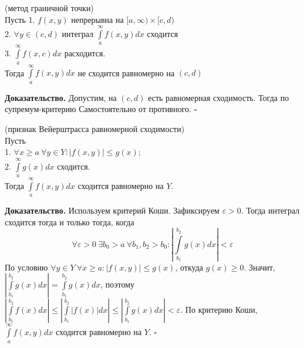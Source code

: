 \begin{theor}
    (метод граничной точки)\\
    Пусть 1. $f(x,y)$ непрерывна на $[a,\infty)\times[c,d)$\\
    2. $\forall y\in (c,d)$ интеграл $\int\limits_{a}^{\infty} f(x,y)dx$ 
    сходится \\
    3. $\int\limits_{a}^{\infty}f(x,c)dx$ расходится.\\
    Тогда $\int\limits_{a}^{\infty}f(x,y)dx$ не сходится равномерно на 
    $(c,d)$
\end{theor}
\textbf{Доказательство.} Допустим, на $(c,d)$ есть равномерная сходимость.
Тогда по супремум-критерию
Самостоятельно от противного. 
$\square$ 

\begin{theor}
    (признак Вейерштрасса равномерной сходимости)\\
    Пусть\\
    1. $\forall x\geqslant a~\forall y\in Y:|f(x,y)|\leqslant g(x)$;\\
    2. $\int\limits_{a}^{\infty}g(x)dx$ сходится.\\
Тогда $\int\limits_{a}^{\infty}f(x,y)dx$ сходится равномерно на  $Y$.
\end{theor}
\textbf{Доказательство.}  Используем критерий Коши. Зафиксируем 
$\varepsilon>0$. Тогда интеграл сходится тогда и только тогда, когда
$$\forall \varepsilon>0~\exists b_0>a~\forall b_1,b_2>b_0:
\left| \int\limits_{b_1}^{b_2} g(x)dx \right|<\varepsilon$$
По условию $\forall y\in Y~\forall x\geqslant a:|f(x,y)|\leqslant g(x)$, 
откуда $g(x)\geqslant 0$. Значит,
$\left|\int\limits_{b_1}^{b_2}g(x)dx\right|=\int\limits_{b_1}^{b_2}g(x)dx$,
поэтому $\left| \int\limits_{b_1}^{b_2}f(x)dx \right| \leqslant 
\left| \int\limits_{b_1}^{b_2} |f(x)|dx \right| \leqslant 
\left| \int\limits_{b_1}^{b_2}g(x)dx\right| <\varepsilon$. По критерию Коши,
$\int\limits_{a}^{\infty}f(x,y)dx$ сходится равномерно на $Y$. $\square$ 


